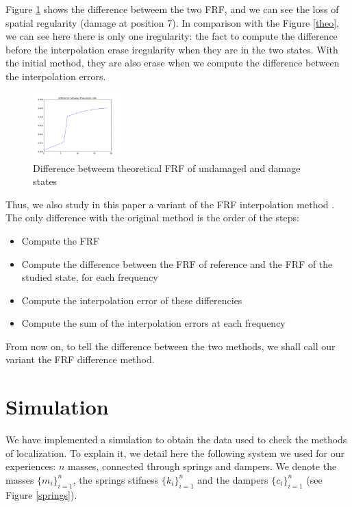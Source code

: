 \documentclass[journal]{IEEEtran}
\begin{document}
Figure \ref{theodiff} shows the difference betweem the two FRF, and we can see the loss of spatial regularity (damage at position 7).
In comparison with the Figure \ref{theo}, we can see here there is only one iregularity: the fact to compute the difference before the interpolation erase iregularity when they are in the two states. With the initial method, they are also erase when we compute the difference between the interpolation errors.

\begin{figure}[h!]
  \centering
  \includegraphics[width=0.3\textwidth]{images/theodiff60.png}
  \caption{Difference betweem theoretical FRF of undamaged and damage states}
  \label{theodiff}
\end{figure}


Thus, we also study in this paper a variant of the FRF interpolation method . The only difference with the original method is the order of the steps:
\begin{itemize}
\item Compute the FRF
\item Compute the difference between the FRF of reference and the FRF of the studied state, for each frequency
\item Compute the interpolation error of these differencies
\item Compute the sum of the interpolation errors at each frequency
\end{itemize}

From now on, to tell the difference between the two methods, we shall call our variant the FRF difference method.



\section{Simulation}


We have implemented a simulation to obtain the data used to check the methods of localization. To explain it, we detail here the following system we used for our experiences: $n$ masses, connected
through springs and dampers. We denote the masses $\{m_i\}_{i=1}^n$, the springs stifness $\{k_i\}_{i=1}^n$ and the dampers $\{c_i\}_{i=1}^n$ (see Figure \ref{springs}).
\end{document}
